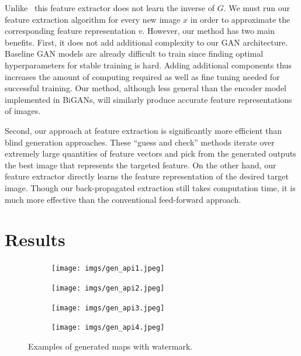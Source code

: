 \documentclass[11pt,twocolumn,letterpaper]{article}
\begin{document}
Unlike~\cite{bigan} this feature extractor does not learn the inverse of $G$. We must run our feature extraction algorithm for every new image $x$ in order to approximate the corresponding feature representation $v$. However, our method has two main benefits. First, it does not add additional complexity to our GAN architecture. Baseline GAN models are already difficult to train since finding optimal hyperparameters for stable training is hard. Adding additional components thus increases the amount of computing required as well as fine tuning needed for successful training. Our method, although less general than the encoder model implemented in BiGANs, will similarly produce accurate feature representations of images.

Second, our approach at feature extraction is significantly more efficient than blind generation approaches. These ``guess and check'' methods iterate over extremely large quantities of feature vectors and pick from the generated outputs the best image that represents the targeted feature. On the other hand, our feature extractor directly learns the feature representation of the desired target image. Though our back-propagated extraction still takes computation time, it is much more effective than the conventional feed-forward approach.

\section{Results}\label{sec:results}

\begin{figure}[ht]
    \centering
    \begin{subfigure}[b]{0.24\linewidth}
        \texttt{[image: imgs/gen\_api1.jpeg]}
    \end{subfigure}
    \begin{subfigure}[b]{0.24\linewidth}
        \texttt{[image: imgs/gen\_api2.jpeg]}
    \end{subfigure}
    \begin{subfigure}[b]{0.24\linewidth}
        \texttt{[image: imgs/gen\_api3.jpeg]}
    \end{subfigure}
    \begin{subfigure}[b]{0.24\linewidth}
        \texttt{[image: imgs/gen\_api4.jpeg]}
    \end{subfigure}
        \caption{Examples of generated maps with watermark.}
        \label{fig:generated_api}
\end{figure}
\end{document}
